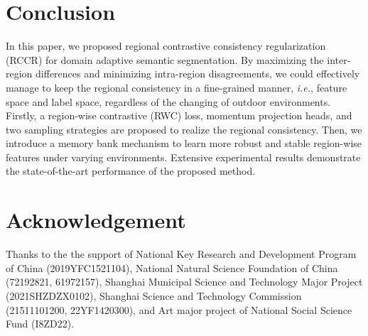 \documentclass{article}
\begin{document}
\section{Conclusion}
In this paper, we proposed regional contrastive consistency regularization (RCCR) for domain adaptive semantic segmentation. By maximizing the inter-region differences and minimizing intra-region disagreements, we could effectively manage to keep the regional consistency in a fine-grained manner, \emph{i.e.}, feature space and label space,  regardless of the changing of outdoor environments. Firstly, a region-wise contrastive (RWC) loss, momentum projection heads, and two sampling strategies are proposed to realize the regional consistency. 
Then, we introduce a memory bank mechanism to learn more robust and stable region-wise features under varying environments.  Extensive experimental results demonstrate the state-of-the-art performance of the proposed method. 
\section{Acknowledgement}
Thanks to the the support of National Key Research and Development Program of China (2019YFC1521104), National Natural Science Foundation of China (72192821, 61972157), Shanghai Municipal Science and Technology Major Project  (2021SHZDZX0102), Shanghai Science and Technology Commission (21511101200, 22YF1420300), and Art major project of National Social Science Fund (I8ZD22).



\end{document}
